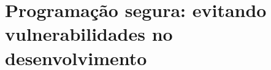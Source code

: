 \chapter{Programação segura: evitando vulnerabilidades no desenvolvimento}
\label{chap:heap_overflow}
